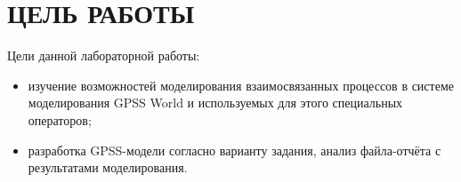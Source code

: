 \section{ЦЕЛЬ РАБОТЫ}

Цели данной лабораторной работы:

\begin{itemize}
\item
  изучение возможностей моделирования взаимосвязанных процессов в системе моделирования
  GPSS World и используемых для этого специальных операторов;
\item
  разработка GPSS-модели согласно варианту задания, 
  анализ файла-отчёта с результатами моделирования.
\end{itemize}
